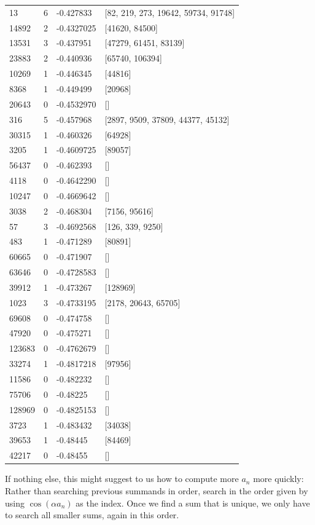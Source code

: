 \documentclass{article}
\theoremstyle{definition}
\theoremstyle{remark}
\numberwithin{equation}{section}
\begin{document}
\begin{tabular}{llll}
13 & 6 & -0.427833 & [82, 219, 273, 19642, 59734, 91748]\\
14892 & 2 & -0.4327025 & [41620, 84500]\\
13531 & 3 & -0.437951 & [47279, 61451, 83139]\\
23883 & 2 & -0.440936 & [65740, 106394]\\
10269 & 1 & -0.446345 & [44816]\\
8368 & 1 & -0.449499 & [20968]\\
20643 & 0 & -0.4532970 & []\\
316 & 5 & -0.457968 & [2897, 9509, 37809, 44377, 45132]\\
30315 & 1 & -0.460326 & [64928]\\
3205 & 1 & -0.4609725 & [89057]\\
56437 & 0 & -0.462393 & []\\
4118 & 0 & -0.4642290 & []\\
10247 & 0 & -0.4669642 & []\\
3038 & 2 & -0.468304 & [7156, 95616]\\
57 & 3 & -0.4692568 & [126, 339, 9250]\\
483 & 1 & -0.471289 & [80891]\\
60665 & 0 & -0.471907 & []\\
63646 & 0 & -0.4728583 & []\\
39912 & 1 & -0.473267 & [128969]\\
1023 & 3 & -0.4733195 & [2178, 20643, 65705]\\
69608 & 0 & -0.474758 & []\\
47920 & 0 & -0.475271 & []\\
123683 & 0 & -0.4762679 & []\\
33274 & 1 & -0.4817218 & [97956]\\
11586 & 0 & -0.482232 & []\\
75706 & 0 & -0.48225 & []\\
128969 & 0 & -0.4825153 & []\\
3723 & 1 & -0.483432 & [34038]\\
39653 & 1 & -0.48445 & [84469]\\
42217 & 0 & -0.48455 & []
\end{tabular}

If nothing else, this might suggest to us how to compute more $a_n$ more
quickly: Rather than searching previous summands in order, search in
the order given by using $\cos(\alpha a_n)$ as the index.  Once we find a
sum that is unique, we only have to search all smaller sums, again in
this order.  
\end{document}
